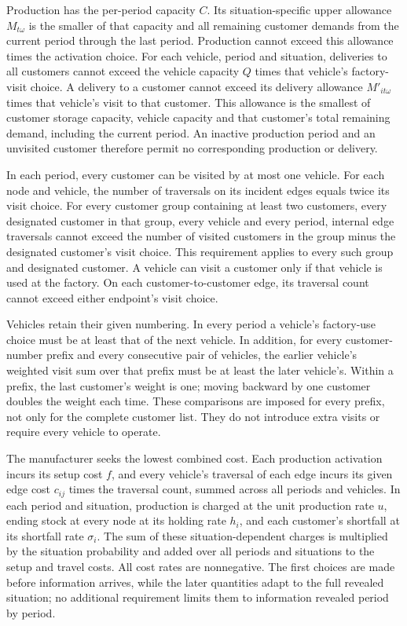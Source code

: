 \documentclass[10pt]{article}
\begin{document}
Production has the per-period capacity $C$. Its situation-specific upper allowance $M_{t\omega}$ is the smaller of that capacity and all remaining customer demands from the current period through the last period. Production cannot exceed this allowance times the activation choice. For each vehicle, period and situation, deliveries to all customers cannot exceed the vehicle capacity $Q$ times that vehicle's factory-visit choice. A delivery to a customer cannot exceed its delivery allowance $M'_{it\omega}$ times that vehicle's visit to that customer. This allowance is the smallest of customer storage capacity, vehicle capacity and that customer's total remaining demand, including the current period. An inactive production period and an unvisited customer therefore permit no corresponding production or delivery.

In each period, every customer can be visited by at most one vehicle. For each node and vehicle, the number of traversals on its incident edges equals twice its visit choice. For every customer group containing at least two customers, every designated customer in that group, every vehicle and every period, internal edge traversals cannot exceed the number of visited customers in the group minus the designated customer's visit choice. This requirement applies to every such group and designated customer. A vehicle can visit a customer only if that vehicle is used at the factory. On each customer-to-customer edge, its traversal count cannot exceed either endpoint's visit choice.

Vehicles retain their given numbering. In every period a vehicle's factory-use choice must be at least that of the next vehicle. In addition, for every customer-number prefix and every consecutive pair of vehicles, the earlier vehicle's weighted visit sum over that prefix must be at least the later vehicle's. Within a prefix, the last customer's weight is one; moving backward by one customer doubles the weight each time. These comparisons are imposed for every prefix, not only for the complete customer list. They do not introduce extra visits or require every vehicle to operate.

The manufacturer seeks the lowest combined cost. Each production activation incurs its setup cost $f$, and every vehicle's traversal of each edge incurs its given edge cost $c_{ij}$ times the traversal count, summed across all periods and vehicles. In each period and situation, production is charged at the unit production rate $u$, ending stock at every node at its holding rate $h_i$, and each customer's shortfall at its shortfall rate $\sigma_i$. The sum of these situation-dependent charges is multiplied by the situation probability and added over all periods and situations to the setup and travel costs. All cost rates are nonnegative. The first choices are made before information arrives, while the later quantities adapt to the full revealed situation; no additional requirement limits them to information revealed period by period.
\end{document}
